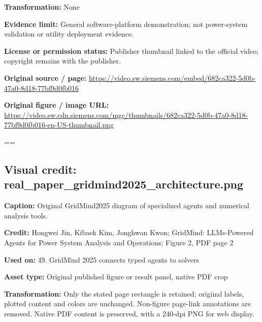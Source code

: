 \documentclass[10pt,letterpaper]{article}
\begin{document}
\textbf{Transformation:} None\par
\textbf{Evidence limit:} General software-platform demonstration; not power-system validation or utility deployment evidence.\par
\textbf{License or permission status:} Publisher thumbnail linked to the official video; copyright remains with the publisher.\par
\textbf{Original source / page:} \href{https://video.sw.siemens.com/embed/682ca322-5d0b-47a0-8d18-77bf9d0fb016}{\small\ttfamily https:/\allowbreak{}/\allowbreak{}video.\allowbreak{}sw.\allowbreak{}siemens.\allowbreak{}com/\allowbreak{}embed/\allowbreak{}682ca322-\allowbreak{}5d0b-\allowbreak{}47a0-\allowbreak{}8d18-\allowbreak{}77bf9d0fb016}\par
\textbf{Original figure / image URL:} \href{https://video.sw.cdn.siemens.com/mgc/thumbnails/682ca322-5d0b-47a0-8d18-77bf9d0fb016-en-US-thumbnail.png}{\small\ttfamily https:/\allowbreak{}/\allowbreak{}video.\allowbreak{}sw.\allowbreak{}cdn.\allowbreak{}siemens.\allowbreak{}com/\allowbreak{}mgc/\allowbreak{}thumbnails/\allowbreak{}682ca322-\allowbreak{}5d0b-\allowbreak{}47a0-\allowbreak{}8d18-\allowbreak{}77bf9d0fb016-\allowbreak{}en-\allowbreak{}US-\allowbreak{}thumbnail.\allowbreak{}png}\par
\egroup\par\noindent\box\readingEntry\par\medskip
\setbox\readingEntry=\vbox\bgroup\hsize=\linewidth\subsection*{Visual credit: real\_paper\_gridmind2025\_architecture.png}
\textbf{Caption:} Original GridMind2025 diagram of specialized agents and numerical analysis tools.\par
\textbf{Credit:} Hongwei Jin, Kibaek Kim, Jonghwan Kwon; GridMind: LLMs-Powered Agents for Power System Analysis and Operations; Figure 2, PDF page 2\par
\textbf{Used on:} 49. GridMind 2025 connects typed agents to solvers\par
\textbf{Asset type:} Original published figure or result panel, native PDF crop\par
\textbf{Transformation:} Only the stated page rectangle is retained; original labels, plotted content and colors are unchanged. Non-figure page-link annotations are removed. Native PDF content is preserved, with a 240-dpi PNG for web display.\par
\end{document}
